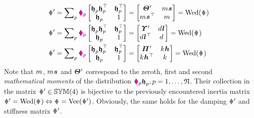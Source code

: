 \begin{subequations}
\begin{align}
 \bodyInertiaMatp{}{} = \sumParticles \particleMass{\PidxI} \begin{bmatrix} \particleBodyPos{\PidxI} \particleBodyPos{\PidxI}^\top & \particleBodyPos{\PidxI}^\top \\ \particleBodyPos{\PidxI} & 1 \end{bmatrix} 
 &= \begin{bmatrix} \bodyMOIp{}{}{} & \bodyMass{}{}\bodyCOM{}{}{} \\ \bodyMass{}{}\bodyCOM{}{}{}^\top & \bodyMass{}{} \end{bmatrix}
 = \wedMatOp(\bodyInertiaMat{}{})
\\
 \bodyDissMatp{}{} = \sumParticles \particleDamping{\PidxI} \begin{bmatrix} \particleBodyPos{\PidxI} \particleBodyPos{\PidxI}^\top & \particleBodyPos{\PidxI}^\top \\ \particleBodyPos{\PidxI} & 1 \end{bmatrix} 
 &= \begin{bmatrix} \bodyMODp{}{}{} & \bodyDamping{}{}\bodyCOD{}{}{} \\ \bodyDamping{}{}\bodyCOD{}{}{}^\top & \bodyDamping{}{} \end{bmatrix}
 = \wedMatOp(\bodyDissMat{}{})
\\
 \bodyStiffMatp{}{} = \sumParticles \particleStiffness{\PidxI} \begin{bmatrix} \particleBodyPos{\PidxI} \particleBodyPos{\PidxI}^\top & \particleBodyPos{\PidxI}^\top \\ \particleBodyPos{\PidxI} & 1 \end{bmatrix} 
 &= \begin{bmatrix} \bodyMOSp{}{}{} & \bodyStiffness{}{}\bodyCOS{}{}{} \\ \bodyStiffness{}{}\bodyCOS{}{}{}^\top & \bodyStiffness{}{} \end{bmatrix}
 = \wedMatOp(\bodyStiffMat{}{})
\end{align}
\end{subequations}
Note that $\bodyMass{}{}$, $\bodyMass{}{}\bodyCOM{}{}{}$ and $\bodyMOIp{}{}{}$ correspond to the zeroth, first and second \textit{mathematical moments} of the distribution $\textcolor{magenta}{\blacklozenge}_{p} \boldsymbol{\mathfrak{h}}_{p}, p=1,\ldots,\mathfrak{N}$.
Their collection in the matrix $\bodyInertiaMatp{}{} \in \SymMat(4)$ is bijective to the previously encountered inertia matrix $\bodyInertiaMatp{}{} = \wedMatOp(\bodyInertiaMat{}{}) \Leftrightarrow \bodyInertiaMat{}{} = \veeMatOp(\bodyInertiaMatp{}{})$.
Obviously, the same holds for the damping $\bodyStiffMatp{}{}$ and stiffness matrix $\bodyDissMatp{}{}$.

